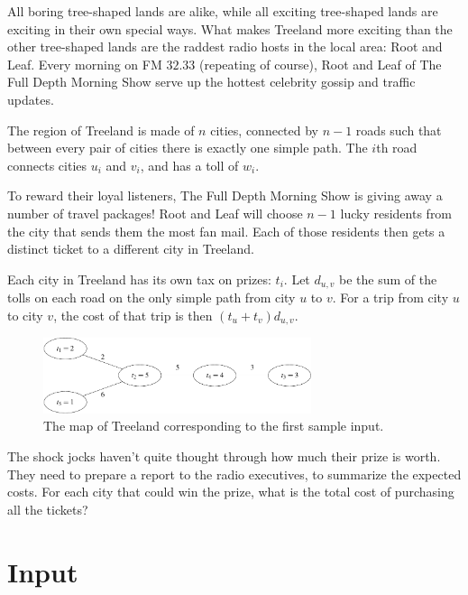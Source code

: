 

\noindent
All boring tree-shaped lands are alike, while all exciting tree-shaped lands
are exciting in their own special ways. What makes Treeland more exciting than
the other tree-shaped lands are the raddest radio hosts in the local area: Root
and Leaf. Every morning on FM $32.33$ (repeating of course), Root and Leaf of
The Full Depth Morning Show serve up the hottest celebrity gossip and traffic
updates.

The region of Treeland is made of $n$ cities, connected by $n - 1$ roads such
that between every pair of cities there is exactly one simple path. The $i$th
road connects cities $u_i$ and $v_i$, and has a toll of $w_i$.

To reward their loyal listeners, The Full Depth Morning Show is giving away a
number of travel packages! Root and Leaf will choose $n - 1$ lucky residents
from the city that sends them the most fan mail. Each of those residents then
gets a distinct ticket to a different city in Treeland.

Each city in Treeland has its own tax on prizes: $t_i$. Let $d_{u, v}$ be the
sum of the tolls on each road on the only simple path from city $u$ to $v$. For
a trip from city $u$ to city $v$, the cost of that trip is then $(t_u + t_v)
d_{u, v}$.

\begin{figure}[ht!]
\begin{center}
  \includegraphics[width=0.7\textwidth]{1}
  \caption{The map of Treeland corresponding to the first sample input.}
  \label{radioprize:1}
\end{center}
\end{figure}

The shock jocks haven't quite thought through how much their prize is worth.
They need to prepare a report to the radio executives, to summarize the
expected costs. For each city that could win the prize, what is the total cost
of purchasing all the tickets?

\section*{Input}

